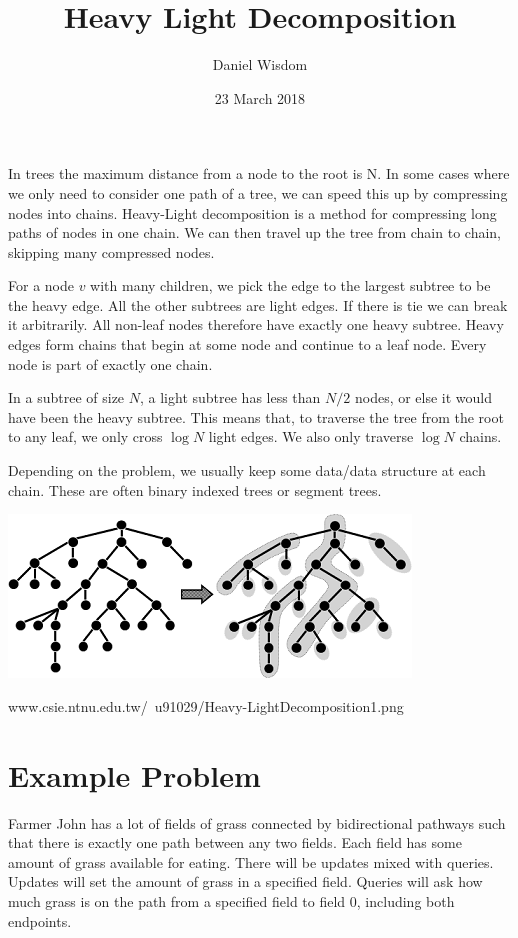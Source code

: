 \documentclass{article}
\title{Heavy Light Decomposition}
\author{Daniel Wisdom}
\date{23 March 2018}
\begin{document}
\maketitle



In trees the maximum distance from a node to the root is N.  In some cases where we only need to consider one path of a tree, we can speed this up by compressing nodes into chains.  Heavy-Light decomposition is a method for compressing long paths of nodes in one chain.  We can then travel up the tree from chain to chain, skipping many compressed nodes.

For a node $v$ with many children, we pick the edge to the largest subtree to be the heavy edge.  All the other subtrees are light edges.  If there is tie we can break it arbitrarily.  All non-leaf nodes therefore have exactly one heavy subtree.  Heavy edges form chains that begin at some node and continue to a leaf node.  Every node is part of exactly one chain.

In a subtree of size $N$, a light subtree has less than $N/2$ nodes, or else it would have been the heavy subtree.  This means that, to traverse the tree from the root to any leaf, we only cross $\log N$ light edges.  We also only traverse $\log N$ chains.

Depending on the problem, we usually keep some data/data structure at each chain.  These are often binary indexed trees or segment trees.

\begin{center}
    \includegraphics{Heavy-LightDecomposition1.png}
    
    www.csie.ntnu.edu.tw/~u91029/Heavy-LightDecomposition1.png
\end{center}

\section{Example Problem}

Farmer John has a lot of fields of grass connected by bidirectional pathways such that there is exactly one path between any two fields.  Each field has some amount of grass available for eating.  There will be updates mixed with queries.  Updates will set the amount of grass in a specified field.  Queries will ask how much grass is on the path from a specified field to field 0, including both endpoints.
\end{document}

